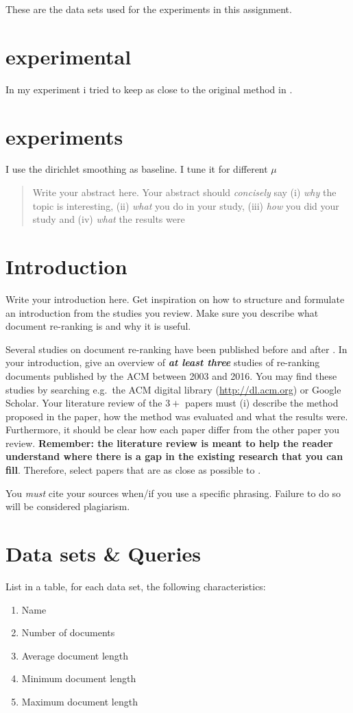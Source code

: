 \documentclass{sig-alternate}
\begin{document}
These are the data sets used for the experiments in this assignment.

\section{experimental }
In my experiment i tried to keep as close to the original method in \cite{woo2010achieving}.

\section{experiments}
I use the dirichlet smoothing as baseline. I tune it for different $\mu$

\begin{abstract}
Write your abstract here. Your abstract should \emph{concisely} say (i) \emph{why} the topic is interesting, (ii) \emph{what} you do in your study, (iii) \emph{how} you did your study and (iv) \emph{what} the results were
\end{abstract}

\section{Introduction}
Write your introduction here. Get inspiration on how to structure and formulate an introduction from the studies you review. Make sure you describe what document re-ranking is and why it is useful.

Several studies on document re-ranking have been published before and after \cite{woo2010achieving}. In your introduction, give an overview of \textbf{\emph{at least three}} studies of re-ranking documents published by the ACM between 2003 and 2016. You may find these studies by searching e.g.\ the ACM digital library (\url{http://dl.acm.org}) or Google Scholar. Your literature review of the $3+$ papers must (i) describe the method proposed in the paper, how the method was evaluated and what the results were. Furthermore, it should be clear how each paper differ from the other paper you review. \textbf{Remember: the literature review is meant to help the reader understand where there is a gap in the existing research that you can fill}. Therefore, select papers that are as close as possible to \cite{woo2010achieving}.

You \emph{must} cite your sources when/if you use a specific phrasing. Failure to do so will be considered plagiarism.

\section{Data sets \& Queries}
List in a table, for each data set, the following characteristics:
\begin{enumerate}
\item Name
\item Number of documents
\item Average document length
\item Minimum document length
\item Maximum document length
\end{enumerate}
\end{document}
